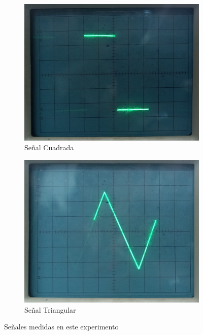 \begin{figure}[H]
    \begin{subfigure}{0.45\textwidth}
        \centering
        \includegraphics[width=1\linewidth]{Imagenes/Cuad3.jpeg}
        \caption{Señal Cuadrada}
        \label{fig:desfExp1}
    \end{subfigure}
    \hspace*{\fill}
    \begin{subfigure}{0.45\textwidth}
        \centering
        \includegraphics[width=0.96\linewidth]{Imagenes/Triang3.jpeg}
        \caption{Señal Triangular}
        \label{fig:corrFp}
    \end{subfigure}
    \caption{Señales medidas en este experimento}
\end{figure}

